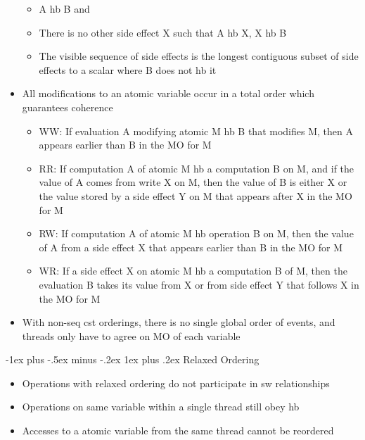 \documentclass[10pt, landscape]{article}
\makeatletter
\renewcommand{\subsection}{\@startsection{subsection}{3}{0mm}%
                                {-1ex plus -.5ex minus -.2ex}%
                                {1ex plus .2ex}%
                                {\normalfont\small\bfseries}}%
\makeatother
\begin{document}
\begin{multicols*}{3}
\begin{itemize}
\begin{itemize}
        \item A hb B and
        \item There is no other side effect X such that A hb X, X hb B
        \item The visible sequence of side effects is the longest contiguous subset of side effects to a scalar where B does not hb it
    \end{itemize}
    \item All modifications to an atomic variable occur in a total order which guarantees coherence
    \begin{itemize}
        \item WW: If evaluation A modifying atomic M hb B that modifies M, then A appears earlier than B in the MO for M
        \item RR: If computation A of atomic M hb a computation B on M, and if the value of A comes from write X on M, then the value of B is either X or the value stored by a side effect Y on M that appears after X in the MO for M
        \item RW: If computation A of atomic M hb operation B on M, then the value of A from a side effect X that appears earlier than B in the MO for M
        \item WR: If a side effect X on atomic M hb a computation B of M, then the evaluation B takes its value from X or from side effect Y that follows X in the MO for M
    \end{itemize}
    \item With non-seq cst orderings, there is no single global order of events, and threads only have to agree on MO of each variable
\end{itemize}

\subsection{Relaxed Ordering}
\begin{itemize}
    \item Operations with relaxed ordering do not participate in sw relationships
    \item Operations on same variable within a single thread still obey hb
    \item Accesses to a atomic variable from the same thread cannot be reordered
\end{itemize}


\end{multicols*}
\end{document}
